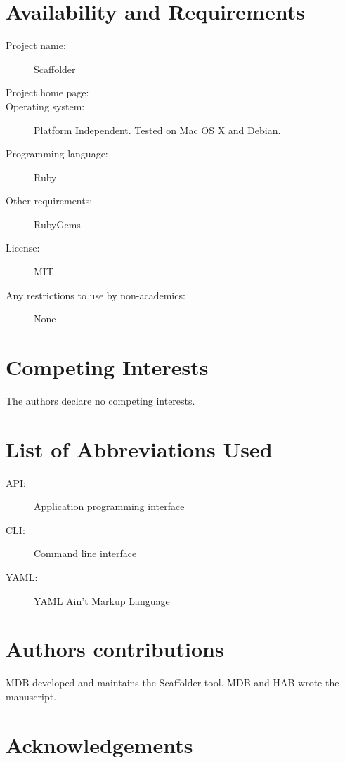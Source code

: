 \documentclass[10pt]{bmc_article}
\newenvironment{bmcformat}{\begin{raggedright}\baselineskip20pt\sloppy\setboolean{publ}{false}}{\end{raggedright}\baselineskip20pt\sloppy}
\begin{document}
\begin{bmcformat}
\clearpage

\section*{Availability and Requirements} %

  \begin{description}
    \item[Project name:] Scaffolder
    \item[Project home page:] \scaffolder
    \item[Operating system:] Platform Independent. Tested on Mac OS X and
    Debian.
    \item[Programming language:] Ruby
    \item[Other requirements:] RubyGems
    \item[License:] MIT
    \item[Any restrictions to use by non-academics:] None
  \end{description}

\clearpage

\section*{Competing Interests} %

The authors declare no competing interests.

\section*{List of Abbreviations Used} %

  \begin{description}
    \item[API:] Application programming interface
    \item[CLI:] Command line interface
    \item[YAML:] YAML Ain't Markup Language\cite{yaml}
  \end{description}

\section*{Authors contributions} %

MDB developed and maintains the Scaffolder tool. MDB and HAB wrote the
manuscript.

\section*{Acknowledgements} %


\end{bmcformat}
\end{document}
